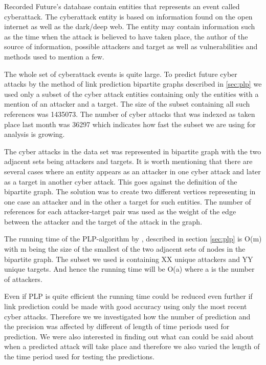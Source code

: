 Recorded Future's database contain entities that represents an event called cyberattack. The cyberattack entity is based on information found on the open internet as well as the dark/deep web. The entity may contain information such as the time when the attack is believed to have taken place, the author of the source of information, possible attackers and target as well as vulnerabilities and methods used to mention a few.

The whole set of cyberattack events is quite large. To predict future cyber attacks by the method of link prediction bipartite graphs described in \ref{sec:plp} we used only a subset of the cyber attack entities containing only the entities with a mention of an attacker and a target. The size of the subset containing all such references was 1435073. The number of cyber attacks that was indexed as taken place last month was 36297 which indicates how fast the subset we are using for analysis is growing.

The cyber attacks in the data set was represented in bipartite graph with the two adjacent sets being attackers and targets. It is worth mentioning that there are several cases where an entity appears as an attacker in one cyber attack and later as a target in another cyber attack. This goes against the definition of the bipartite graph. The solution was to create two different vertices representing in one case an attacker and in the other a target for such entities. The number of references for each attacker-target pair was used as the weight of the edge between the attacker and the target of the attack in the graph.

The running time of the PLP-algorithm by \citet{plp}, described in section \ref{sec:plp} is O(m) with m being the size of the smallest of the two adjacent sets of nodes in the bipartite graph. The subset we used is containing XX unique attackers and YY unique targets. And hence the running time will be O(a) where a is the number of attackers.

Even if PLP is quite efficient the running time could be reduced even further if link prediction could be made with good accuracy using only the most recent cyber attacks. Therefore we we investigated how the number of prediction and the precision was affected by different of length of time periods used for prediction. We were also interested in finding out what can could be said about when a predicted attack will take place and therefore we also varied the length of the time period used for testing the predictions.

